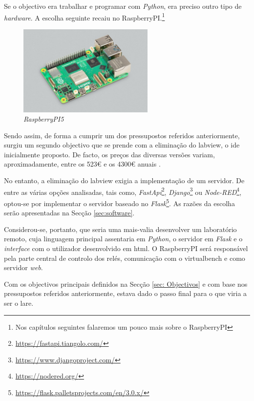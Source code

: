 Se o objectivo era trabalhar e programar com \textit{Python}, era preciso outro tipo de \textit{hardware}. A escolha seguinte recaiu no \gls{RaspberryPI}.\footnote{Nos capítulos seguintes falaremos um pouco mais sobre o \gls{RaspberryPI}}

\begin{figure}[hbtp]
    \centering
    \includegraphics[width=0.6\textwidth]{figures/raspberrypi5.jpg}
    \caption{\textit{RaspberryPI5} \cite{introRaspberrypi5}}
    \label{fig:Raspberrypi5}
\end{figure}

Sendo assim, de forma a cumprir um dos pressupostos referidos anteriormente, surgiu um segundo objectivo que se prende com a eliminação do \acrshort{labview}, o \acrshort{ide} inicialmente proposto. De facto, os preços das diversas versões variam, aproximadamente, entre os 523€ e os 4300€ anuais \cite{labviewpricing}.

No entanto, a eliminação do \acrshort{labview} exigia a implementação de um servidor. De entre as várias opções analisadas, tais como, \textit{FastApi}\footnote{\url{https://fastapi.tiangolo.com/}}, \textit{Django}\footnote{\url{https://www.djangoproject.com/}} ou \textit{Node-RED}\footnote{\url{https://nodered.org/}}, optou-se por implementar o servidor baseado no \textit{Flask}\footnote{\url{https://flask.palletsprojects.com/en/3.0.x/}}. As razões da escolha serão apresentadas na Secção \ref{sec:software}. 

Considerou-se, portanto, que seria uma mais-valia desenvolver um \acrshort{laboratório remoto}, cuja linguagem principal assentaria em \textit{Python}, o servidor em \textit{Flask} e o \textit{interface} com o utilizador desenvolvido em \acrfull{html}. O \gls{RaspberryPI} será responsável pela parte central de controlo dos relés, comunicação com o \acrshort{virtualbench} e como servidor \textit{web}.

Com os objectivos principais definidos na Secção \ref{sec: Objectivos} e com base nos pressupostos referidos anteriormente, estava dado o passo final para o que viria a ser o \acrshort{lare}.

